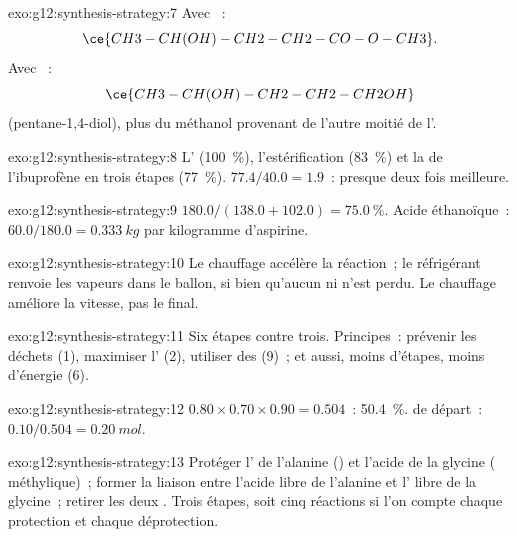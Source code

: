 \begin{solution}{exo:g12:synthesis-strategy:7}
Avec ~:
\[ \ce{CH3-CH(OH)-CH2-CH2-CO-O-CH3} . \]
Avec ~:
\[ \ce{CH3-CH(OH)-CH2-CH2-CH2OH} \]
(pentane-1,4-diol), plus du méthanol provenant de l'autre moitié de
l'.
\end{solution}

\begin{solution}{exo:g12:synthesis-strategy:8}
L' (\qty{100}{\percent}), l'estérification
(\qty{83}{\percent}) et la  de l'ibuprofène en trois étapes
(\qty{77}{\percent}). $77.4/40.0 = 1.9$~: presque deux fois meilleure.
\end{solution}

\begin{solution}{exo:g12:synthesis-strategy:9}
$180.0/(138.0 + 102.0) = \qty{75.0}{\percent}$. Acide éthanoïque~:
$60.0/180.0 = \qty{0.333}{kg}$ par kilogramme d'aspirine.
\end{solution}

\begin{solution}{exo:g12:synthesis-strategy:10}
Le chauffage accélère la réaction~; le réfrigérant renvoie les vapeurs
dans le ballon, si bien qu'aucun  ni  n'est perdu. Le
chauffage améliore la vitesse, pas le  final.
\end{solution}

\begin{solution}{exo:g12:synthesis-strategy:11}
Six étapes contre trois. Principes~: prévenir les déchets (1), maximiser
l' (2), utiliser des  (9)~; et aussi, moins
d'étapes, moins d'énergie (6).
\end{solution}

\begin{solution}{exo:g12:synthesis-strategy:12}
$0.80 \times 0.70 \times 0.90 = 0.504$~: \qty{50.4}{\percent}. 
de départ~: $0.10/0.504 = \qty{0.20}{mol}$.
\end{solution}

\begin{solution}{exo:g12:synthesis-strategy:13}
Protéger l' de l'alanine () et l'acide de la glycine (
méthylique)~;
former la liaison  entre l'acide libre de l'alanine et l'
libre de la glycine~; retirer les deux . Trois
étapes, soit cinq réactions si l'on compte chaque protection et chaque
déprotection.
\end{solution}

